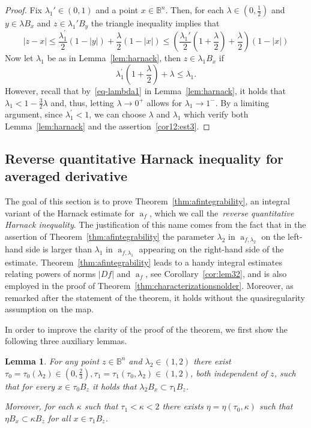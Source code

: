 \documentclass[11pt,a4paper,reqno]{amsart}
\newtheorem{lem}[theorem]{Lemma}
\theoremstyle{definition}
\renewcommand{\a}{\operatorname{a}}
\newcommand{\B}{\mathbb{B}^n}
\numberwithin{komcounter}{section}
\begin{document}
\begin{proof}
 Fix $\lambda_1' \in (0,1)$ and a point $x\in \B$. Then, for each $\lambda \in (0, \frac12)$ and $y\in \lambda B_x$ and $z\in \lambda_1'B_y$ the triangle inequality implies that
$$
|z-x|\leq \frac{\lambda_1^\prime}{2}(1-|y|)+\frac{\lambda }{2}(1-|x|)\leq  \left(\frac{\lambda_1'}{2}(1+\frac{\lambda}{2}) +\frac{\lambda}{2}\right) (1-|x|)
$$
Now let $\lambda_1$ be as in Lemma~\ref{lem:harnack}, then $z\in\lambda_1 B_x$ if
$$
\lambda_1^\prime (1+\frac{\lambda}{2} )+\lambda \leq \lambda_1.
$$
However, recall that by~\eqref{eq-lambda1} in Lemma~\ref{lem:harnack}, it holds that $\lambda_1<1-\frac32 \lambda$ and, thus, letting $\lambda \rightarrow 0^+$ allows for $\lambda_1\rightarrow 1^-$. By a limiting argument, since $\lambda_1^\prime <1$, we can choose $\lambda$ and $\lambda_1$ which verify both Lemma~\ref{lem:harnack} and the assertion~\eqref{cor12:est3}.
\end{proof}

\subsection{Reverse quantitative Harnack inequality for averaged derivative} 

The goal of this section is to prove Theorem~\ref{thm:afintegrability}, an integral variant of the Harnack estimate for $\a_f$, which we call the~\emph{reverse quantitative Harnack inequality}. The justification of this name comes from the fact that in the assertion of Theorem~\ref{thm:afintegrability} the parameter $\lambda_2$ in $\a_{f,\lambda_2}$ on the left-hand side is larger than $\lambda_1$ in $\a_{f,\lambda_1}$ appearing on the right-hand side of the estimate. Theorem~\ref{thm:afintegrability} leads to a handy integral estimates relating powers of norms $|Df|$ and $\a_f$, see Corollary~\ref{cor:lem32}, and is also employed in the proof of Theorem~\ref{thm:characterizationsnolder}. Moreover, as remarked after the statement of the theorem, it holds without the quasiregularity assumption on the map.

In order to improve the clarity of the proof of the theorem, we first show the following three auxiliary lemmas.

\begin{lem}\label{lem: uniscale-balls}
	For any point $z \in \B$ and $\lambda_2\in (1,2)$ there exist $\tau_0=\tau_0(\lambda_2)\in (0,\frac23),\tau_1 =\tau_1 (\tau_0,\lambda_2)\in (1,2)$, both independent of $z$, such that for every $x\in \tau_0 B_z$ it holds that $\lambda_2 B_x\subset \tau_1 B_z$. 
	
Moreover, for each $\kappa$ such that $\tau_1 <\kappa <2$ there exists $\eta =\eta (\tau_0, \kappa )$ such that $\eta B_x\subset \kappa B_z$ for all $x\in \tau_1 B_z$. 
\end{lem}
\end{document}

